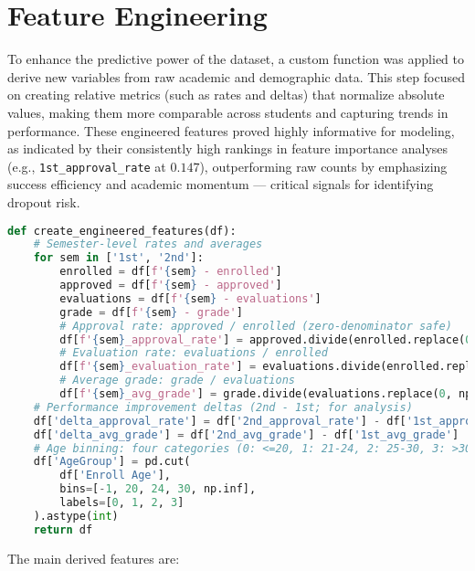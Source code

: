 \documentclass[twoside,final]{hcmut-report}
\begin{document}
\section{Feature Engineering}
To enhance the predictive power of the dataset, a custom function was applied to derive new variables from raw academic and demographic data. This step focused on creating relative metrics (such as rates and deltas) that normalize absolute values, making them more comparable across students and capturing trends in performance. These engineered features proved highly informative for modeling, as indicated by their consistently high rankings in feature importance analyses (e.g., \texttt{1st\_approval\_rate} at $0.147$), outperforming raw counts by emphasizing success efficiency and academic momentum — critical signals for identifying dropout risk.
\begin{lstlisting}[language=python]
def create_engineered_features(df):
    # Semester-level rates and averages
    for sem in ['1st', '2nd']:
        enrolled = df[f'{sem} - enrolled']
        approved = df[f'{sem} - approved']
        evaluations = df[f'{sem} - evaluations']
        grade = df[f'{sem} - grade']
        # Approval rate: approved / enrolled (zero-denominator safe)
        df[f'{sem}_approval_rate'] = approved.divide(enrolled.replace(0, np.nan)).fillna(0)
        # Evaluation rate: evaluations / enrolled
        df[f'{sem}_evaluation_rate'] = evaluations.divide(enrolled.replace(0, np.nan)).fillna(0)
        # Average grade: grade / evaluations
        df[f'{sem}_avg_grade'] = grade.divide(evaluations.replace(0, np.nan)).fillna(0)
    # Performance improvement deltas (2nd - 1st; for analysis)
    df['delta_approval_rate'] = df['2nd_approval_rate'] - df['1st_approval_rate']
    df['delta_avg_grade'] = df['2nd_avg_grade'] - df['1st_avg_grade']
    # Age binning: four categories (0: <=20, 1: 21-24, 2: 25-30, 3: >30)
    df['AgeGroup'] = pd.cut(
        df['Enroll Age'],
        bins=[-1, 20, 24, 30, np.inf],
        labels=[0, 1, 2, 3]
    ).astype(int)
    return df
\end{lstlisting}
The main derived features are:
\end{document}

